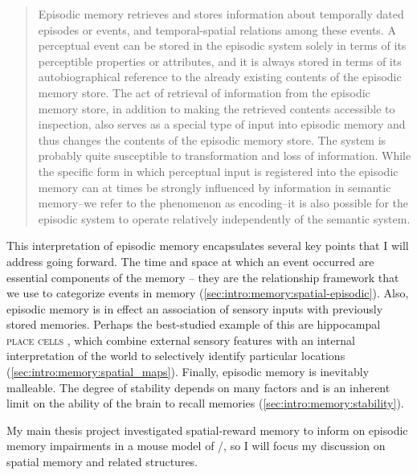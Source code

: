 \begin{quote}
Episodic memory retrieves and stores information about temporally dated episodes or events, and temporal-spatial relations among these events. A perceptual event can be stored in the episodic system solely in terms of its perceptible properties or attributes, and it is always stored in terms of its autobiographical reference to the already existing contents of the episodic memory store. The act of retrieval of information from the episodic memory store, in addition to making the retrieved contents accessible to inspection, also serves as a special type of input into episodic memory and thus changes the contents of the episodic memory store. The system is probably quite susceptible to transformation and loss of information. While the specific form in which perceptual input is registered into the episodic memory can at times be strongly influenced by information in semantic memory--we refer to the phenomenon as encoding--it is also possible for the episodic system to operate relatively independently of the semantic system.
\end{quote}

This interpretation of episodic memory encapsulates several key points that I will address going forward.
The time and space at which an event occurred are essential components of the memory -- they are the relationship framework that we use to categorize events in memory (\autoref{sec:intro:memory:spatial-episodic}).
Also, episodic memory is in effect an association of sensory inputs with previously stored memories.
Perhaps the best-studied example of this are hippocampal \textsc{place cells} \citep{O'Keefe1971}, which combine external sensory features with an internal interpretation of the world to selectively identify particular locations (\autoref{sec:intro:memory:spatial_maps}).
Finally, episodic memory is inevitably malleable.
The degree of stability depends on many factors and is an inherent limit on the ability of the brain to recall memories (\autoref{sec:intro:memory:stability}).

My main thesis project investigated spatial-reward memory to inform on episodic memory impairments in a mouse model of \scz/, so I will focus my discussion on spatial memory and related structures.


